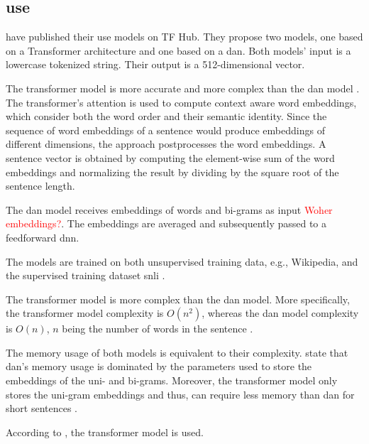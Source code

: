 \subsection{\ac{use}}\label{subsec:univ-sent-encoder}

\citeauthor{UniversalSentEnc2018} have published their \ac{use} models on TF Hub.
They propose two models, one based on a Transformer architecture and one based on a \ac{dan}.
Both models' input is a lowercase tokenized string.
Their output is a 512-dimensional vector.

The transformer model is more accurate and more complex than the \ac{dan} model \cite{UniversalSentEnc2018}.
The transformer's attention is used to compute context aware word embeddings, which consider both the word order and their semantic identity.
Since the sequence of word embeddings of a sentence would produce embeddings of different dimensions, the approach postprocesses the word embeddings.
A sentence vector is obtained by computing the element-wise sum of the word embeddings 
and normalizing the result by dividing by the square root of the sentence length.

The \ac{dan} model receives embeddings of words and bi-grams as input \textcolor{red}{Woher embeddings?}.
The embeddings are averaged and subsequently passed to a feedforward \ac{dnn}.

The models are trained on both unsupervised training data, e.g., Wikipedia, and the supervised training dataset \ac{snli} \cite{UniversalSentEnc2018, HfsentTrans2019}.

The transformer model is more complex than the \ac{dan} model.
More specifically, the transformer model complexity is $O(n^2)$, whereas the \ac{dan} model complexity is $O(n)$, 
$n$ being the number of words in the sentence \cite{UniversalSentEnc2018}.

The memory usage of both models is equivalent to their complexity.
\citeauthor{UniversalSentEnc2018} state that \ac{dan}'s memory usage is dominated by the parameters used to store the embeddings of the uni- and bi-grams.
Moreover, the transformer model only stores the uni-gram embeddings and thus, can require less memory than \ac{dan} for short sentences \cite{UniversalSentEnc2018}.

According to \citeauthor{HfsentTrans2019}, the transformer model is used.



